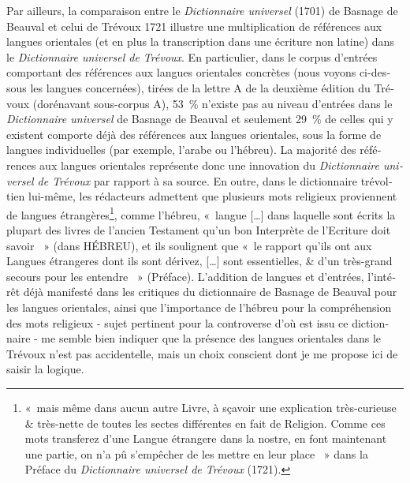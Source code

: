 \documentclass[output=paper,colorlinks,citecolor=brown,arabicfont,chinesefont,booklanguage=french]{langscibook}
\begin{document}
\begin{otherlanguage}{french}
Par ailleurs, la comparaison entre le \emph{Dictionnaire universel} (1701) de Basnage de Beauval et celui de Trévoux 1721 illustre une multiplication de références aux langues orientales (et en plus la transcription dans une écriture non latine) dans le \emph{Dictionnaire universel de Trévoux}. En particulier, dans le corpus d’entrées comportant des références aux langues orientales concrètes (nous voyons ci-dessous les langues concernées), tirées de la lettre A de la deuxième édition du Trévoux (dorénavant sous-corpus A), 53~\% n’existe pas au niveau d’entrées dans le \emph{Dictionnaire universel} de Basnage de Beauval et seulement 29~\% de celles qui y existent comporte déjà des références aux langues orientales, sous la forme de langues individuelles (par exemple, l'arabe ou  l'hébreu). La majorité des références aux langues orientales représente donc une innovation du \emph{Dictionnaire universel de Trévoux} par rapport à sa source. En outre, dans le dictionnaire trévoltien lui-même, les rédacteurs admettent que plusieurs mots religieux proviennent de langues étrangères\footnote{«~mais même dans aucun autre Livre, à sçavoir une explication très-curieuse \& très-nette de toutes les sectes différentes en fait de Religion. Comme ces mots transferez d'une Langue étrangere dans la nostre, en font maintenant une partie, on n'a pû s'empêcher de les mettre en leur place ~» dans la Préface du \emph{Dictionnaire universel de Trévoux} (1721).}, comme l’hébreu, «~langue […] dans laquelle sont écrits la plupart des livres de l’ancien Testament qu’un bon Interprète de l’Ecriture doit savoir ~» (dans HÉBREU), et ils soulignent que «~le rapport qu'ils ont aux Langues étrangeres dont ils sont dérivez, […] sont essentielles, \& d'un très-grand secours pour les entendre ~» (Préface). L’addition de langues et d'entrées, l'intérêt déjà manifesté dans les critiques du dictionnaire de Basnage de Beauval pour les langues orientales, ainsi que l'importance de l'hébreu pour la compréhension des mots religieux - sujet pertinent pour la controverse d’où est issu ce dictionnaire - me semble bien indiquer que la présence des langues orientales dans le Trévoux n'est pas accidentelle, mais un choix conscient dont je me propose ici de saisir la logique.


\end{otherlanguage}
\end{document}
